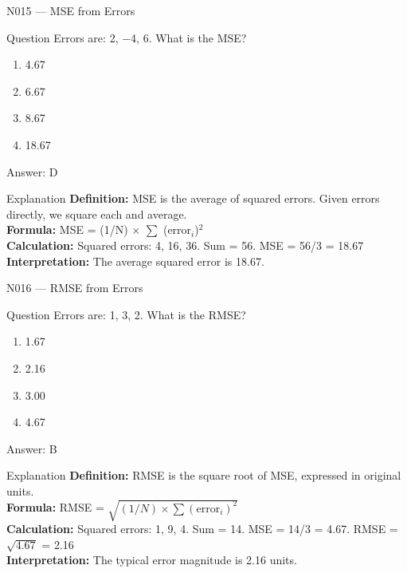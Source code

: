 \documentclass[aspectratio=169,8pt]{beamer}
\begin{document}
	\begin{frame}{N015 --- MSE from Errors}
		\begin{block}{Question}
			Errors are: 2, $-$4, 6. What is the MSE?
			\begin{enumerate}
				\item 4.67
				\item 6.67
				\item 8.67
				\item 18.67
			\end{enumerate}
		\end{block}
		\begin{exampleblock}{Answer: D}\end{exampleblock}
		\begin{block}{Explanation}
			\textbf{Definition:} MSE is the average of squared errors. Given errors directly, we square each and average.\\
			\textbf{Formula:} MSE = (1/N) $\times$ $\sum$ (error$_{i}$)$^{2}$\\
			\textbf{Calculation:} Squared errors: 4, 16, 36. Sum = 56. MSE = 56/3 = 18.67\\
			\textbf{Interpretation:} The average squared error is 18.67.
		\end{block}
	\end{frame}
	
	\begin{frame}{N016 --- RMSE from Errors}
		\begin{block}{Question}
			Errors are: 1, 3, 2. What is the RMSE?
			\begin{enumerate}
				\item 1.67
				\item 2.16
				\item 3.00
				\item 4.67
			\end{enumerate}
		\end{block}
		\begin{exampleblock}{Answer: B}\end{exampleblock}
		\begin{block}{Explanation}
			\textbf{Definition:} RMSE is the square root of MSE, expressed in original units.\\
			\textbf{Formula:} RMSE = $\sqrt{(1/N) \times \sum (\text{error}_{i})^{2}}$\\
			\textbf{Calculation:} Squared errors: 1, 9, 4. Sum = 14. MSE = 14/3 = 4.67. RMSE = $\sqrt{4.67}$ = 2.16\\
			\textbf{Interpretation:} The typical error magnitude is 2.16 units.
		\end{block}
	\end{frame}
	
\end{document}
